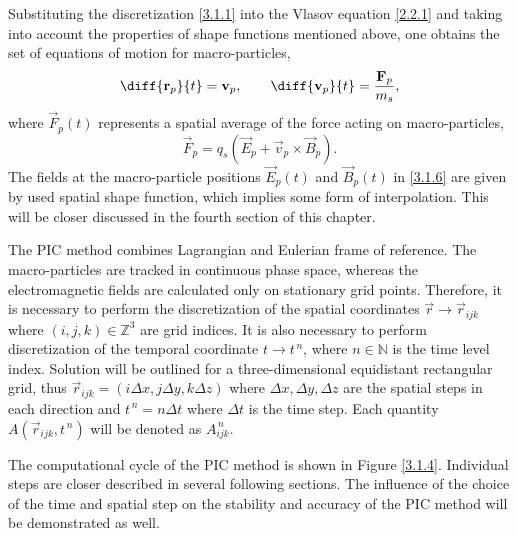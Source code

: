 Substituting the discretization \ref{3.1.1} into the Vlasov equation \ref{2.2.1} and taking into account the properties of shape functions mentioned above, one obtains the set of equations of motion for macro-particles,
\begin{equation}
\label{3.1.5}
\diff{\vec{r}_{p}}{t} = \vec{v}_{p}, \qquad \diff{\vec{v}_{p}}{t} = \frac{\vec{F}_p}{m_s},
\end{equation}
where $ \vec{F}_p \left( t\right) $ represents a spatial average of the force acting on macro-particles,
\begin{equation}
\label{3.1.6}
\vec{F}_p = q_s \left(\vec{E}_p + \vec{v}_p \times \vec{B}_p \right).
\end{equation}
The fields at the macro-particle positions $ \vec{E}_p \left( t\right) $ and $ \vec{B}_p \left( t\right) $ in \ref{3.1.6} are given by used spatial shape function, which implies some form of interpolation. This will be closer discussed in the fourth section of this chapter.

The PIC method combines Lagrangian and Eulerian frame of reference. The macro-particles are tracked in continuous phase space, whereas the electromagnetic fields are calculated only on stationary grid points. Therefore, it is necessary to perform the discretization of the spatial coordinates $ \vec{r} \rightarrow \vec{r}_{i j k} $ where $ (i,j,k) \in \mathbb{Z}^{3} $ are grid indices. It is also necessary to perform discretization of the temporal coordinate $ t \rightarrow t^{\,n} $, where $ n \in \mathbb{N} $ is the time level index. Solution will be outlined for a three-dimensional equidistant rectangular grid, thus $ \vec{r}_{i j k} = \left(i \Delta x, j \Delta y, k \Delta z\right) $ where $ \Delta x, \Delta y, \Delta z $ are the spatial steps in each direction and $ t^{\,n} = n\Delta t $ where $ \Delta t $ is the time step. Each quantity $ A \left(\vec{r}_{i j k}, t^{\,n} \right) $ will be denoted as $ A_{ijk}^{\,n} $.

The computational cycle of the PIC method is shown in Figure \ref{3.1.4}. Individual steps are closer described in several following sections. The influence of the choice of the time and spatial step on the stability and accuracy of the PIC method will be demonstrated as well.